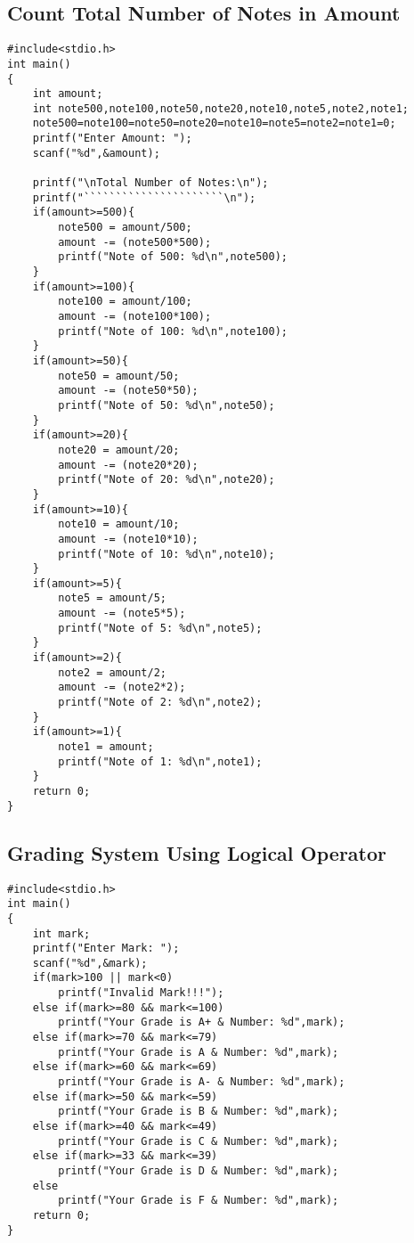 \documentclass[a4paper,14pt]{article}
\begin{document}
\subsection{Count Total Number of Notes in Amount}
\vspace{0.5cm}
\begin{lstlisting}[caption={Count Total Number of Notes in Amount}]
#include<stdio.h>
int main()
{
    int amount;
    int note500,note100,note50,note20,note10,note5,note2,note1;
    note500=note100=note50=note20=note10=note5=note2=note1=0;
    printf("Enter Amount: ");
    scanf("%d",&amount);
 
    printf("\nTotal Number of Notes:\n");
    printf("``````````````````````\n");
    if(amount>=500){
        note500 = amount/500;
        amount -= (note500*500);
        printf("Note of 500: %d\n",note500);
    }
    if(amount>=100){
        note100 = amount/100;
        amount -= (note100*100);
        printf("Note of 100: %d\n",note100);
    }
    if(amount>=50){
        note50 = amount/50;
        amount -= (note50*50);
        printf("Note of 50: %d\n",note50);
    }
    if(amount>=20){
        note20 = amount/20;
        amount -= (note20*20);
        printf("Note of 20: %d\n",note20);
    }
    if(amount>=10){
        note10 = amount/10;
        amount -= (note10*10);
        printf("Note of 10: %d\n",note10);
    }
    if(amount>=5){
        note5 = amount/5;
        amount -= (note5*5);
        printf("Note of 5: %d\n",note5);
    }
    if(amount>=2){
        note2 = amount/2;
        amount -= (note2*2);
        printf("Note of 2: %d\n",note2);
    }
    if(amount>=1){
        note1 = amount;
        printf("Note of 1: %d\n",note1);
    }
    return 0;
}
\end{lstlisting}
\newpage

\subsection{Grading System Using Logical Operator}
\vspace{0.5cm}
\begin{lstlisting}[caption={Grading System Using Logical Operator}]
#include<stdio.h>
int main()
{
    int mark;
    printf("Enter Mark: ");
    scanf("%d",&mark);
    if(mark>100 || mark<0)
        printf("Invalid Mark!!!");
    else if(mark>=80 && mark<=100)
        printf("Your Grade is A+ & Number: %d",mark);
    else if(mark>=70 && mark<=79)
        printf("Your Grade is A & Number: %d",mark);
    else if(mark>=60 && mark<=69)
        printf("Your Grade is A- & Number: %d",mark);
    else if(mark>=50 && mark<=59)
        printf("Your Grade is B & Number: %d",mark);
    else if(mark>=40 && mark<=49)
        printf("Your Grade is C & Number: %d",mark);
    else if(mark>=33 && mark<=39)
        printf("Your Grade is D & Number: %d",mark);
    else
        printf("Your Grade is F & Number: %d",mark);
    return 0;
}
\end{lstlisting}
\newpage
\end{document}
